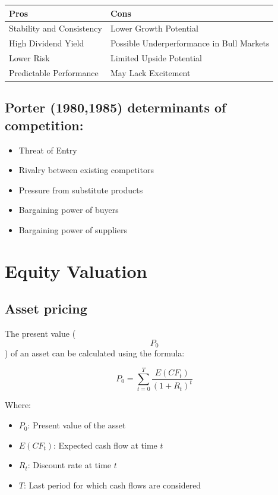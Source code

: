 \documentclass[
]{book}
\providecommand{\tightlist}{%
  \setlength{\itemsep}{0pt}\setlength{\parskip}{0pt}}
\begin{document}
\begin{longtable}[]{@{}ll@{}}
\toprule\noalign{}
Pros & Cons \\
\midrule\noalign{}
\endhead
\bottomrule\noalign{}
\endlastfoot
Stability and Consistency & Lower Growth Potential \\
High Dividend Yield & Possible Underperformance in Bull Markets \\
Lower Risk & Limited Upside Potential \\
Predictable Performance & May Lack Excitement \\
\end{longtable}

\hypertarget{porter-19801985-determinants-of-competition}{%
\subsection{Porter (1980,1985) determinants of
competition:}\label{porter-19801985-determinants-of-competition}}

\begin{itemize}
\tightlist
\item
  Threat of Entry
\item
  Rivalry between existing competitors
\item
  Pressure from substitute products
\item
  Bargaining power of buyers
\item
  Bargaining power of suppliers
\end{itemize}

\hypertarget{equity-valuation}{%
\section{Equity Valuation}\label{equity-valuation}}

\hypertarget{asset-pricing}{%
\subsection{Asset pricing}\label{asset-pricing}}

The present value (\[ P_0 \]) of an asset can be calculated using the
formula:

\[ P_0 = \sum_{t=0}^{T} \frac{E(CF_t)}{(1+R_t)^t} \]

Where:

\begin{itemize}
\tightlist
\item
  \(P_0\): Present value of the asset
\item
  \(E(CF_t)\): Expected cash flow at time \(t\)
\item
  \(R_t\): Discount rate at time \(t\)
\item
  \(T\): Last period for which cash flows are considered
\end{itemize}
\end{document}
